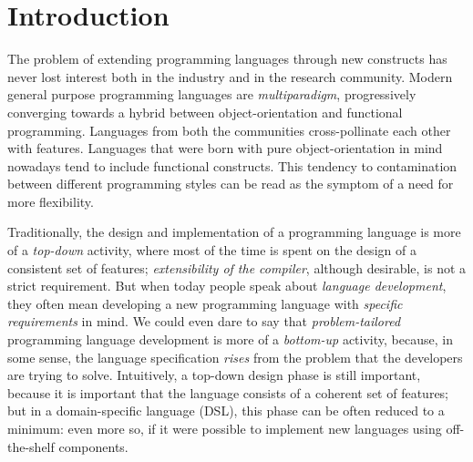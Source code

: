 \chapter{Introduction}\label{sect:introduction}
The problem of extending programming languages through new constructs has never lost interest both in the industry and in the research community. Modern general purpose programming languages are \textit{multiparadigm}, progressively converging towards a hybrid between object-orientation and functional programming. Languages from both the communities cross-pollinate each other with features. Languages that were born with pure object-orientation in mind nowadays tend to include functional constructs. This tendency to contamination between different programming styles can be read as the symptom of a need for more flexibility.

Traditionally, the design and implementation of a programming language is more of a \textit{top-down} activity, where most of the time is spent on the design of a consistent set of features; \textit{extensibility of the compiler}, although desirable, is not a strict requirement. But when today people speak about \textit{language development}, they often mean developing a new programming language with \textit{specific requirements} in mind. We could even dare to say that \textit{problem-tailored} programming language development is more of a \textit{bottom-up} activity, because, in some sense, the language specification \textit{rises} from the problem that the developers are trying to solve. Intuitively, a top-down design phase is still important, because it is important that the language consists of a coherent set of features; but in a domain-specific language (DSL), this phase can be often reduced to a minimum: even more so, if it were possible to implement new languages using off-the-shelf components.

